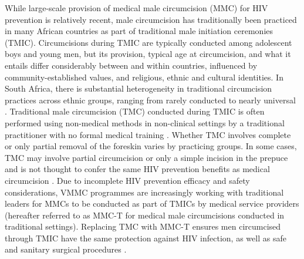 \documentclass{article}
\begin{document}
While large-scale provision of medical male circumcision (MMC) for HIV prevention is relatively recent, male circumcision has traditionally been practiced in many African countries as part of traditional male initiation ceremonies (TMIC). Circumcisions during TMIC are typically conducted among adolescent boys and young men, but its provision, typical age at circumcision, and what it entails differ considerably between and within countries, influenced by community-established values, and religious, ethnic and cultural identities. In South Africa, there is substantial heterogeneity in traditional circumcision practices across ethnic groups, ranging from rarely conducted to nearly universal \cite{peltzer2014prevalence, connolly2008male}. Traditional male circumcision (TMC) conducted during TMIC is often performed using non-medical methods in non-clinical settings by a traditional practitioner with no formal medical training \cite{drain2006male, wilcken2010traditional, weiss2000male}. Whether TMC involves complete or only partial removal of the foreskin varies by practicing groups. In some cases, TMC may involve partial circumcision or only a simple incision in the prepuce and is not thought to confer the same HIV prevention benefits as medical circumcision \cite{WHOTraditional, shaffer2007protective, bailey2008male}. Due to incomplete HIV prevention efficacy and safety considerations, VMMC programmes are increasingly working with traditional leaders for MMCs to be conducted as part of TMICs by medical service providers (hereafter referred to as MMC-T for medical male circumcisions conducted in traditional settings). Replacing TMC with MMC-T ensures men circumcised through TMIC have the same protection against HIV infection, as well as safe and sanitary surgical procedures \cite{WHOTraditional}.
\end{document}
